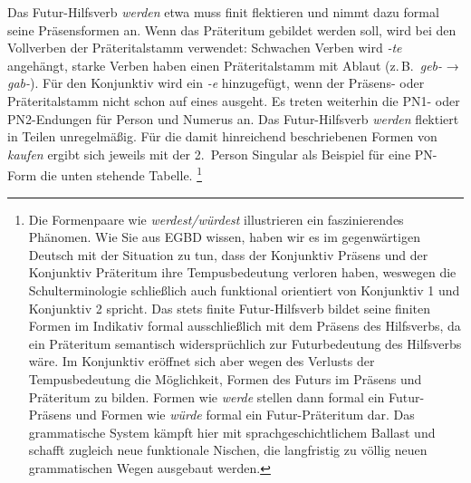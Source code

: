 Das Futur-Hilfsverb \textit{werden} etwa muss finit flektieren und nimmt dazu formal seine Präsensformen an.
Wenn das Präteritum gebildet werden soll, wird bei den Vollverben der Präteritalstamm verwendet: Schwachen Verben wird \textit{-te} angehängt, starke Verben haben einen Präteritalstamm mit Ablaut (z.\,B.\ \textit{geb-} → \textit{gab-}).
Für den Konjunktiv wird ein \textit{-e} hinzugefügt, wenn der Präsens- oder Präteritalstamm nicht schon auf eines ausgeht.
Es treten weiterhin die PN1- oder PN2-Endungen für Person und Numerus an.
Das Futur-Hilfsverb \textit{werden} flektiert in Teilen unregelmäßig.
Für die damit hinreichend beschriebenen Formen von \textit{kaufen} ergibt sich jeweils mit der 2.~Person Singular als Beispiel für eine PN-Form die unten stehende Tabelle.%
\footnote{Die Formenpaare wie \textit{werdest\slash würdest} illustrieren ein faszinierendes Phänomen.
Wie Sie aus EGBD wissen, haben wir es im gegenwärtigen Deutsch mit der Situation zu tun, dass der Konjunktiv Präsens und der Konjunktiv Präteritum ihre Tempusbedeutung verloren haben, weswegen die Schulterminologie schließlich auch funktional orientiert von Konjunktiv 1 und Konjunktiv 2 spricht.
Das stets finite Futur-Hilfsverb bildet seine finiten Formen im Indikativ formal ausschließlich mit dem Präsens des Hilfsverbs, da ein Präteritum semantisch widersprüchlich zur Futurbedeutung des Hilfsverbs wäre.
Im Konjunktiv eröffnet sich aber wegen des Verlusts der Tempusbedeutung die Möglichkeit, Formen des Futurs im Präsens und Präteritum zu bilden.
Formen wie \textit{werde} stellen dann formal ein Futur-Präsens und Formen wie \textit{würde} formal ein Futur-Präteritum dar.
Das grammatische System kämpft hier mit sprachgeschichtlichem Ballast und schafft zugleich neue funktionale Nischen, die langfristig zu völlig neuen grammatischen Wegen ausgebaut werden.}

